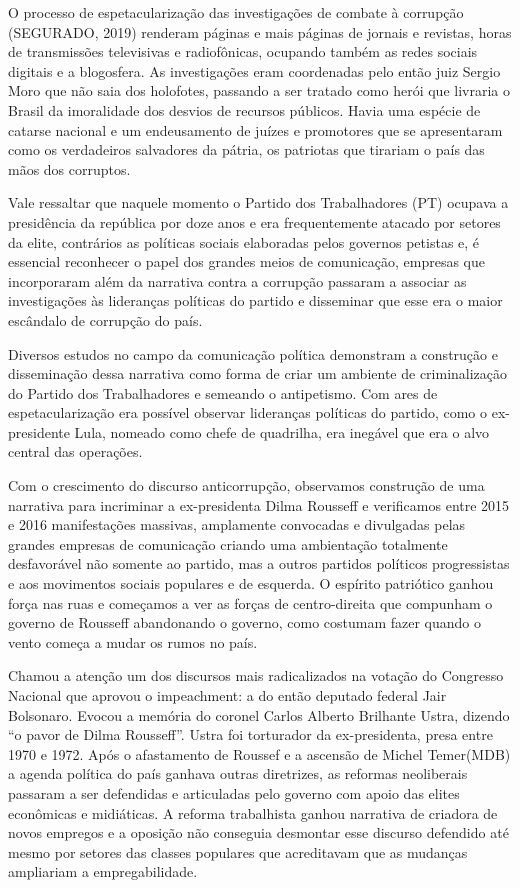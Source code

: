 O processo de espetacularização das investigações de combate à corrupção
(SEGURADO, 2019) renderam páginas e mais páginas de jornais e revistas,
horas de transmissões televisivas e radiofônicas, ocupando também as
redes sociais digitais e a blogosfera. As investigações eram coordenadas
pelo então juiz Sergio Moro que não saia dos holofotes, passando a ser
tratado como herói que livraria o Brasil da imoralidade dos desvios de
recursos públicos. Havia uma espécie de catarse nacional e um
endeusamento de juízes e promotores que se apresentaram como os
verdadeiros salvadores da pátria, os patriotas que tirariam o país das
mãos dos corruptos.

Vale ressaltar que naquele momento o Partido dos Trabalhadores (PT)
ocupava a presidência da república por doze anos e era frequentemente
atacado por setores da elite, contrários as políticas sociais elaboradas
pelos governos petistas e, é essencial reconhecer o papel dos grandes
meios de comunicação, empresas que incorporaram além da narrativa contra
a corrupção passaram a associar as investigações às lideranças políticas
do partido e disseminar que esse era o maior escândalo de corrupção do
país.

Diversos estudos no campo da comunicação política demonstram a
construção e disseminação dessa narrativa como forma de criar um
ambiente de criminalização do Partido dos Trabalhadores e semeando o
antipetismo. Com ares de espetacularização era possível observar
lideranças políticas do partido, como o ex-presidente Lula, nomeado como
chefe de quadrilha, era inegável que era o alvo central das operações.

Com o crescimento do discurso anticorrupção, observamos construção de
uma narrativa para incriminar a ex-presidenta Dilma Rousseff e
verificamos entre 2015 e 2016 manifestações massivas, amplamente
convocadas e divulgadas pelas grandes empresas de comunicação criando
uma ambientação totalmente desfavorável não somente ao partido, mas a
outros partidos políticos progressistas e aos movimentos sociais
populares e de esquerda. O espírito patriótico ganhou força nas ruas e
começamos a ver as forças de centro-direita que compunham o governo de
Rousseff abandonando o governo, como costumam fazer quando o vento
começa a mudar os rumos no país.

Chamou a atenção um dos discursos mais radicalizados na votação do
Congresso Nacional que aprovou o impeachment: a do então deputado
federal Jair Bolsonaro. Evocou a memória do coronel Carlos Alberto
Brilhante Ustra, dizendo ``o pavor de Dilma Rousseff''. Ustra foi
torturador da ex-presidenta, presa entre 1970 e 1972. Após o afastamento
de Roussef e a ascensão de Michel Temer(MDB) a agenda política do país
ganhava outras diretrizes, as reformas neoliberais passaram a ser
defendidas e articuladas pelo governo com apoio das elites econômicas e
midiáticas. A reforma trabalhista ganhou narrativa de criadora de novos
empregos e a oposição não conseguia desmontar esse discurso defendido
até mesmo por setores das classes populares que acreditavam que as
mudanças ampliariam a empregabilidade.

